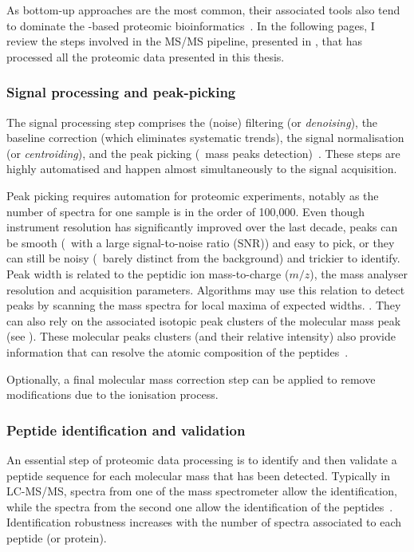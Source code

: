 As bottom-up approaches are the most common,
their associated tools also tend to dominate
the \ms{}-based proteomic bioinformatics~.
In the following pages,
I review the steps involved in the \gls{MS/MS} pipeline,
presented in ,
that has processed all the proteomic data presented in this thesis.\mybr\

\subsubsection{Signal processing and peak-picking}

The signal processing step comprises
the (noise) filtering (or \emph{denoising}),
the baseline correction (which eliminates systematic trends),
the signal normalisation (or \emph{centroiding}),
and the peak picking (\ie\ mass peaks detection)~.
These steps are highly automatised and
happen almost simultaneously to the signal acquisition.\mybr\

Peak picking requires automation for proteomic experiments,
notably as the number of spectra for one sample is in the order of 100,000.
Even though instrument resolution has significantly improved over the last decade,
peaks can be smooth (\ie\ with a large signal-to-noise ratio (\gls{SNR}))
and easy to pick, or they can still be noisy
(\ie\ barely distinct from the background) and trickier to identify.
Peak width is related to the peptidic ion mass-to-charge ($m/z$),
the mass analyser resolution and acquisition parameters.
Algorithms may use this relation to detect peaks by
scanning the mass spectra for local maxima of expected widths. .
They can also rely on
the associated isotopic peak clusters of the molecular mass peak
(see ).
These molecular peaks clusters (and their relative intensity) also provide
information that can resolve the atomic composition of the peptides~.\mybr\

Optionally, a final molecular mass correction step can be applied to remove
modifications due to the ionisation process.\mybr\


\subsubsection{Peptide identification and validation}\label{subsub:peptideID}

An essential step of proteomic data processing is to identify and then validate
a peptide sequence for each molecular mass that has been detected.
Typically in \gls{LC-MS/MS},
spectra from one of the mass spectrometer allow the identification,
while the spectra from the second one allow
the identification of the peptides~.
Identification robustness increases
with the number of spectra associated to each peptide (or protein).\mybr\

